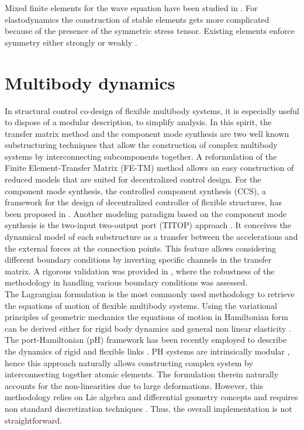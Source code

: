 Mixed finite elements for the wave equation have been studied in \cite{geveci1988,becache2000wave}. For elastodynamics the construction of stable elements gets more complicated because of the presence of the symmetric stress tensor. Existing elements enforce symmetry either strongly \cite{becache2001elas} or weakly \cite{arnold2014elastodynamics}.

\section{Multibody dynamics}

In structural control co-design of flexible multibody systems, it is especially useful to dispose of a modular description, to simplify analysis. In this spirit, the transfer matrix method \cite{rong2010transfer} and the component mode synthesis \cite{hurty1965cms} are two well known substructuring techniques that allow the construction of complex multibody systems by interconnecting subcomponents together. A reformulation of the Finite Element-Transfer Matrix (FE-TM) method \cite{tan1990transfer} allows an easy construction of reduced models that are suited for decentralized control design. For the component mode synthesis, the controlled component synthesis (CCS), a framework for the design of decentralized controller of flexible structures, has been proposed in \cite{young1990}. Another modeling paradigm based on the component mode synthesis is the two-input two-output port (TITOP) approach \cite{alazard2015titop}. It conceives the dynamical model of each substructure as a transfer between the accelerations and the external forces at the connection points. This feature allows considering different boundary conditions by inverting specific channels in the transfer matrix. A rigorous validation was provided in \cite{perez2016flexible,sanfedino2018finite}, where the robustness of the methodology in handling various boundary conditions was assessed. \\
\indent The Lagrangian formulation is the most commonly used methodology to retrieve the equations of motion of flexible multibody systems. {Using the variational principles of geometric mechanics the equations of motion in Hamiltonian form can be derived either for rigid body dynamics \cite[Proposition 7.1.1]{holm2008geometric} and general non linear elasticity \cite[Chapter 3]{marsden1981lectures}.} The port-Hamiltonian (pH) framework \cite{duindam2009} has been recently employed to describe the dynamics of rigid and flexible links \cite{macchelli2007link,macchelli2009multi}. PH systems are intrinsically modular \cite{cervera2007interconnection}, hence this approach naturally allows constructing complex system by interconnecting together atomic elements. The formulation therein naturally accounts for the non-linearities due to large deformations.  However, this methodology relies on Lie algebra and differential geometry concepts and requires non standard discretization techniques \cite{golo2004hamiltonian}. Thus, the overall implementation is not straightforward. \\
